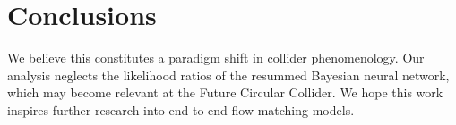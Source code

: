 \section{Conclusions}\label{sec:conclusions}

We believe this constitutes a paradigm shift in collider phenomenology.
Our analysis neglects the likelihood ratios of the resummed Bayesian
neural network, which may become relevant at the Future Circular
Collider. We hope this work inspires further research into end-to-end
flow matching models.

